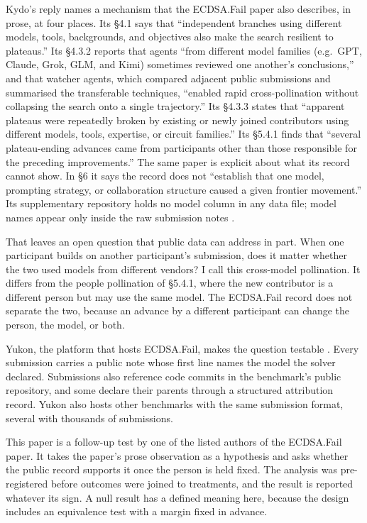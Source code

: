 Kydo's reply names a mechanism that the ECDSA.Fail paper also describes, in prose, at four places.
Its \S4.1 says that ``independent branches using different models, tools, backgrounds, and objectives also make the search resilient to plateaus.''
Its \S4.3.2 reports that agents ``from different model families (e.g.\ GPT, Claude, Grok, GLM, and Kimi) sometimes reviewed one another's conclusions,'' and that watcher agents, which compared adjacent public submissions and summarised the transferable techniques, ``enabled rapid cross-pollination without collapsing the search onto a single trajectory.''
Its \S4.3.3 states that ``apparent plateaus were repeatedly broken by existing or newly joined contributors using different models, tools, expertise, or circuit families.''
Its \S5.4.1 finds that ``several plateau-ending advances came from participants other than those responsible for the preceding improvements.''
The same paper is explicit about what its record cannot show.
In \S6 it says the record does not ``establish that one model, prompting strategy, or collaboration structure caused a given frontier movement.''
Its supplementary repository holds no model column in any data file; model names appear only inside the raw submission notes \citep{long2026supplement}.

That leaves an open question that public data can address in part.
When one participant builds on another participant's submission, does it matter whether the two used models from different vendors?
I call this cross-model pollination.
It differs from the people pollination of \S5.4.1, where the new contributor is a different person but may use the same model.
The ECDSA.Fail record does not separate the two, because an advance by a different participant can change the person, the model, or both.

Yukon, the platform that hosts ECDSA.Fail, makes the question testable \citep{yukon2026}.
Every submission carries a public note whose first line names the model the solver declared.
Submissions also reference code commits in the benchmark's public repository, and some declare their parents through a structured attribution record.
Yukon also hosts other benchmarks with the same submission format, several with thousands of submissions.

This paper is a follow-up test by one of the listed authors of the ECDSA.Fail paper.
It takes the paper's prose observation as a hypothesis and asks whether the public record supports it once the person is held fixed.
The analysis was pre-registered before outcomes were joined to treatments, and the result is reported whatever its sign.
A null result has a defined meaning here, because the design includes an equivalence test with a margin fixed in advance.

